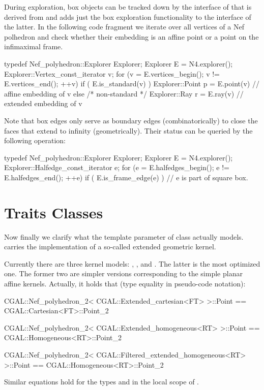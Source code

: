 During exploration, box objects can be tracked down by the interface
of  that is derived from
 and adds just the box
exploration functionality to the interface of the latter. In the
following code fragment we iterate over all vertices of a Nef
polhedron and check whether their embedding is an affine point or a
point on the infimaximal frame.
\begin{ccExampleCode}
typedef Nef_polyhedron::Explorer Explorer;
Explorer E = N4.explorer();
Explorer::Vertex_const_iterator v;
for (v = E.vertices_begin(); v != E.vertices_end(); ++v)
  if ( E.is_standard(v) ) 
    Explorer::Point p = E.point(v) // affine embedding of v
  else /* non-standard */ 
    Explorer::Ray r = E.ray(v) // extended embedding of v
\end{ccExampleCode}

Note that box edges only serve as boundary edges (combinatorically) to
close the faces that extend to infinity (geometrically). Their status
can be queried by the following operation:
\begin{ccExampleCode}
typedef Nef_polyhedron::Explorer Explorer;
Explorer E = N4.explorer();
Explorer::Halfedge_const_iterator e;
for (e = E.halfedges_begin(); e != E.halfedges_end(); ++e)
  if ( E.is_frame_edge(e) ) // e is part of square box.
\end{ccExampleCode}

\section{Traits Classes}

Now finally we clarify what the template parameter of class
 actually models.  carries the
implementation of a so-called extended geometric kernel.

Currently there are three kernel models:
,
, and
. The latter is the most
optimized one. The former two are simpler versions corresponding to
the simple planar affine kernels.  Actually, it holds that (type
equality in pseudo-code notation):
\begin{ccExampleCode}
CGAL::Nef_polyhedron_2< CGAL::Extended_cartesian<FT> >::Point 
  == CGAL::Cartesian<FT>::Point_2

CGAL::Nef_polyhedron_2< CGAL::Extended_homogeneous<RT> >::Point
   == CGAL::Homogeneous<RT>::Point_2

CGAL::Nef_polyhedron_2< CGAL::Filtered_extended_homogeneous<RT> >::Point
   == CGAL::Homogeneous<RT>::Point_2
\end{ccExampleCode}
Similar equations hold for the types  and  in
the local scope of .

